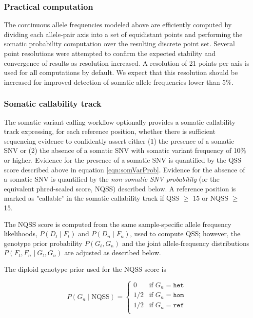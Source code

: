\documentclass{article}
\begin{document}
\subsubsection{Practical computation}

The continuous allele frequencies modeled above are efficiently computed by dividing each allele-pair axis into a set of equidistant points and performing the somatic probability computation over the resulting discrete point set. Several point resolutions were attempted to confirm the expected stability and convergence of results as resolution increased. A resolution of 21 points per axis is used for all computations by default. We expect that this resolution should be increased for improved detection of somatic allele frequencies lower than 5\%.

\subsubsection{Somatic callability track}

The somatic variant calling workflow optionally provides a somatic callability track expressing, for each reference position, whether there is sufficient sequencing evidence to confidently assert either (1) the presence of a somatic SNV or (2) the absence of a somatic SNV with somatic variant frequency of 10\% or higher. Evidence for the presence of a somatic SNV is quantified by the QSS score described above in equation \ref{eqn:somVarProb}. Evidence for the absence of a somatic SNV is quantified by the \emph{non-somatic SNV probability} (or the equivalent phred-scaled score, NQSS) described below. A reference position is marked as "callable" in the somatic callability track if QSS $\ge$ 15 or NQSS $\ge$ 15.

The NQSS score is computed from the same sample-specific allele frequency likelihoods, $P(D_t \mid F_t)$ and $P(D_n \mid F_n)$, used to compute QSS; however, the genotype prior probability $P(G_t, G_n)$ and the joint allele-frequency distributions $P(F_t,F_n \mid G_t,G_n)$ are adjusted as described below.

The diploid genotype prior used for the NQSS score is

\begin{equation*}
P(G_n\mid \text{NQSS})=
\begin{cases}
0 & \text{if } G_n = \texttt{het} \\
1/2 & \text{if } G_n = \texttt{hom} \\
1/2 & \text{if } G_n = \texttt{ref} \\
\end{cases}
\end{equation*}
\end{document}
